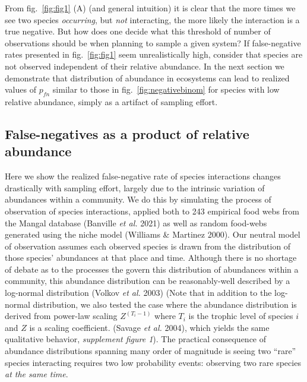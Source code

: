 \documentclass[10pt,oneside]{article}
\begin{document}
From fig.~\ref{fig:fig1} (A) (and general intuition) it is clear that
the more times we see two species \emph{occurring}, but \emph{not}
interacting, the more likely the interaction is a true negative. But how
does one decide what this threshold of number of observations should be
when planning to sample a given system? If false-negative rates
presented in fig.~\ref{fig:fig1} seem unrealistically high, consider
that species are not observed independent of their relative abundance.
In the next section we demonstrate that distribution of abundance in
ecosystems can lead to realized values of \(p_{fn}\) similar to those in
fig.~\ref{fig:negativebinom} for species with low relative abundance,
simply as a artifact of sampling effort.

\hypertarget{false-negatives-as-a-product-of-relative-abundance}{%
\subsection{False-negatives as a product of relative
abundance}\label{false-negatives-as-a-product-of-relative-abundance}}

Here we show the realized false-negative rate of species interactions
changes drastically with sampling effort, largely due to the intrinsic
variation of abundances within a community. We do this by simulating the
process of observation of species interactions, applied both to 243
empirical food webs from the Mangal database (Banville \emph{et al.}
2021) as well as random food-webs generated using the niche model
(Williams \& Martinez 2000). Our neutral model of observation assumes
each observed species is drawn from the distribution of those species'
abundances at that place and time. Although there is no shortage of
debate as to the processes the govern this distribution of abundances
within a community, this abundance distribution can be reasonably-well
described by a log-normal distribution (Volkov \emph{et al.} 2003) (Note
that in addition to the log-normal distribution, we also tested the case
where the abundance distribution is derived from power-law scaling
\(Z^{(T_i-1)}\) where \(T_i\) is the trophic level of species \(i\) and
\(Z\) is a scaling coefficient. (Savage \emph{et al.} 2004), which
yields the same qualitative behavior, \emph{supplement figure 1}). The
practical consequence of abundance distributions spanning many order of
magnitude is seeing two ``rare'' species interacting requires two low
probability events: observing two rare species \emph{at the same time}.
\end{document}
